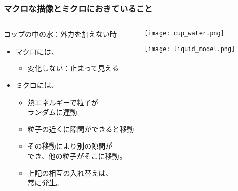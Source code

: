 \documentclass[12pt, dvipdfmx]{beamer}
\begin{document}
\begin{frame}
	\frametitle{マクロな描像とミクロにおきていること}	
		\begin{columns}[T, onlytextwidth]
				\begin{exampleblock}{コップの中の水：外力を加えない時}
					\begin{itemize}
						\item マクロには、
						\begin{itemize}
							\item 変化しない：止まって見える
						\end{itemize}
						\item ミクロには、
						\begin{itemize}
							\item 熱エネルギーで粒子が\\ランダムに運動
							\item 粒子の近くに隙間ができると移動
							\item その移動により別の隙間が\\でき、他の粒子がそこに移動。
							\item 上記の相互の入れ替えは、\\常に発生。
						\end{itemize}
					\end{itemize}
				\end{exampleblock}
					\begin{center}
						\texttt{[image: cup\_water.png]}

						\vspace{5mm}
						\texttt{[image: liquid\_model.png]}
					\end{center}
		\end{columns}
\end{frame}
\end{document}
